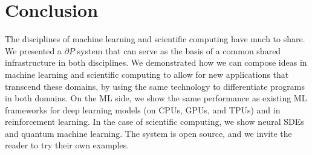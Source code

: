 \documentclass{juliacon}
\begin{document}

\section{Conclusion}

The disciplines of machine learning and scientific computing have much to share. We presented a $\partial P$ system that can serve as the basis of a common shared infrastructure in both disciplines. We demonstrated how we  can compose ideas in machine learning and scientific computing to allow for new applications that transcend these domains, by using the same technology to differentiate programs in both domains. On the ML side, we show the same performance as existing ML frameworks for deep learning models (on CPUs, GPUs, and TPUs) and in reinforcement learning. In the case of scientific computing, we show neural SDEs and quantum machine learning. The system is open source, and we invite the reader to try their own examples.
\end{document}

